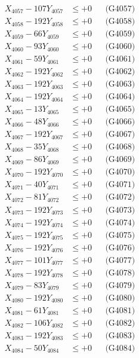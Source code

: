 \documentclass[a4paper,10pt]{article}
\begin{document}
{\begin{align}
X_{4057} - 107Y_{4057} &\leq +0 && \text{(G4057)} \\
X_{4058} - 192Y_{4058} &\leq +0 && \text{(G4058)} \\
X_{4059} - 66Y_{4059} &\leq +0 && \text{(G4059)} \\
X_{4060} - 93Y_{4060} &\leq +0 && \text{(G4060)} \\
\allowbreak
X_{4061} - 59Y_{4061} &\leq +0 && \text{(G4061)} \\
X_{4062} - 192Y_{4062} &\leq +0 && \text{(G4062)} \\
X_{4063} - 192Y_{4063} &\leq +0 && \text{(G4063)} \\
X_{4064} - 192Y_{4064} &\leq +0 && \text{(G4064)} \\
X_{4065} - 13Y_{4065} &\leq +0 && \text{(G4065)} \\
X_{4066} - 48Y_{4066} &\leq +0 && \text{(G4066)} \\
X_{4067} - 192Y_{4067} &\leq +0 && \text{(G4067)} \\
X_{4068} - 35Y_{4068} &\leq +0 && \text{(G4068)} \\
X_{4069} - 86Y_{4069} &\leq +0 && \text{(G4069)} \\
X_{4070} - 192Y_{4070} &\leq +0 && \text{(G4070)} \\
\allowbreak
X_{4071} - 40Y_{4071} &\leq +0 && \text{(G4071)} \\
X_{4072} - 81Y_{4072} &\leq +0 && \text{(G4072)} \\
X_{4073} - 192Y_{4073} &\leq +0 && \text{(G4073)} \\
X_{4074} - 192Y_{4074} &\leq +0 && \text{(G4074)} \\
X_{4075} - 192Y_{4075} &\leq +0 && \text{(G4075)} \\
X_{4076} - 192Y_{4076} &\leq +0 && \text{(G4076)} \\
X_{4077} - 101Y_{4077} &\leq +0 && \text{(G4077)} \\
X_{4078} - 192Y_{4078} &\leq +0 && \text{(G4078)} \\
X_{4079} - 83Y_{4079} &\leq +0 && \text{(G4079)} \\
X_{4080} - 192Y_{4080} &\leq +0 && \text{(G4080)} \\
\allowbreak
X_{4081} - 61Y_{4081} &\leq +0 && \text{(G4081)} \\
X_{4082} - 106Y_{4082} &\leq +0 && \text{(G4082)} \\
X_{4083} - 192Y_{4083} &\leq +0 && \text{(G4083)} \\
X_{4084} - 50Y_{4084} &\leq +0 && \text{(G4084)} \\

\end{align}}
\end{document}
